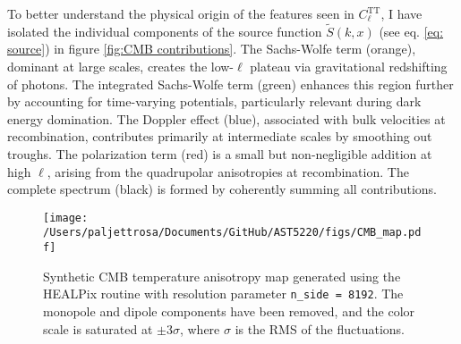 \documentclass{aa}
\numberwithin{equation}{section}
\numberwithin{table}{section}
\numberwithin{figure}{section}
\begin{document}

To better understand the physical origin of the features seen in $C_\ell^\text{TT}$, I have isolated the individual components of the source function $\tilde{S}(k,x)$ (see eq. \eqref{eq: source}) in figure \ref{fig:CMB contributions}. The Sachs-Wolfe term (orange), dominant at large scales, creates the low-$\ell$ plateau via gravitational redshifting of photons. The integrated Sachs-Wolfe term (green) enhances this region further by accounting for time-varying potentials, particularly relevant during dark energy domination. The Doppler effect (blue), associated with bulk velocities at recombination, contributes primarily at intermediate scales by smoothing out troughs. The polarization term (red) is a small but non-negligible addition at high $\ell$, arising from the quadrupolar anisotropies at recombination. The complete spectrum (black) is formed by coherently summing all contributions.

\begin{figure}
  \centering
  \texttt{[image: /Users/paljettrosa/Documents/GitHub/AST5220/figs/CMB\_map.pdf]}
  \caption{Synthetic CMB temperature anisotropy map generated using the HEALPix routine with resolution parameter \texttt{n\_side = 8192}. The monopole and dipole components have been removed, and the color scale is saturated at $\pm3\sigma$, where $\sigma$ is the RMS of the fluctuations.}
  \label{fig:CMB map}
\end{figure}
\end{document}
